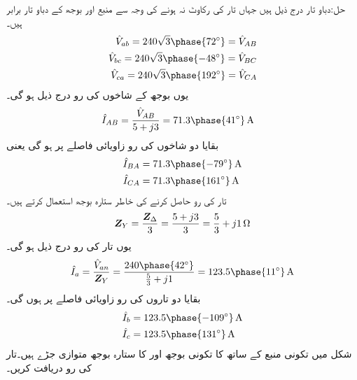 حل:دباو تار درج ذیل ہیں جہاں تار کی رکاوٹ نہ ہونے کی وجہ سے منبع اور بوجھ کے دباو تار برابر ہیں۔
\begin{align*}
\hat{V}_{ab}=240\sqrt{3}\phase{72^{\circ}}=\hat{V}_{AB}\\
\hat{V}_{bc}=240\sqrt{3}\phase{-48^{\circ}}=\hat{V}_{BC}\\
\hat{V}_{ca}=240\sqrt{3}\phase{192^{\circ}}=\hat{V}_{CA}
\end{align*}
یوں بوجھ کے شاخوں کی رو درج ذیل ہو گی۔
\begin{align*}
\hat{I}_{AB}&=\frac{\hat{V}_{AB}}{5+j3}=71.3\phase{41^{\circ}}\,\si{\ampere}
\end{align*}
بقایا دو شاخوں کی رو  زاویائی فاصلے پر ہو گی یعنی
\begin{align*}
\hat{I}_{BA}&=71.3\phase{-79^{\circ}}\,\si{\ampere}\\
\hat{I}_{CA}&=71.3\phase{161^{\circ}}\,\si{\ampere}
\end{align*}
تار کی رو حاصل کرنے کی خاطر ستارہ بوجھ استعمال کرتے ہیں۔
\begin{align*}
{\ensuremath{{\boldsymbol{Z}}}}_{Y}=\frac{{{\boldsymbol{Z}}}_{\Delta}}{3}=\frac{5+j3}{3}=\frac{5}{3}+j1\,\si{\ohm}
\end{align*}
یوں تار کی رو درج ذیل ہو گی۔
\begin{align*}
\hat{I}_a=\frac{\hat{V}_{an}}{\bZ_{Y}}=\frac{240\phase{42^{\circ}}}{\frac{5}{3}+j1}=123.5\phase{11^{\circ}}\,\si{\ampere}
\end{align*}
بقایا دو تاروں کی رو  زاویائی فاصلے پر ہوں گی۔
\begin{align*}
\hat{I}_b&=123.5\phase{-109^{\circ}}\,\si{\ampere}\\
\hat{I}_c&=123.5\phase{131^{\circ}}\,\si{\ampere}\\
\end{align*}
شکل  میں تکونی منبع کے ساتھ  کا تکونی بوجھ اور  کا ستارہ بوجھ متوازی جڑے ہیں۔تار کی رو دریافت کریں۔
